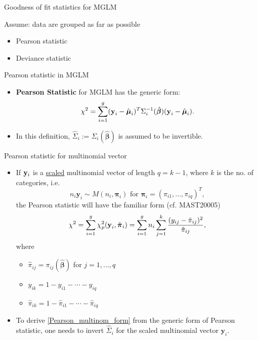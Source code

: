 \documentclass{beamer}
\newcommand{\boldpi}{{\boldsymbol \pi}}
\newenvironment{wideitemize}%
  {\begin{itemize}%
    \setlength{\parskip}{1em}}%
  {\end{itemize}}
\begin{document}
\begin{frame} {Goodness of fit statistics for MGLM}

Assume: data are grouped as far as possible

\begin{itemize}
\item Pearson statistic
\item Deviance statistic
\end{itemize}

\end{frame}

\begin{frame}{Pearson statistic in MGLM}

\begin{itemize}
\item
\textbf{Pearson Statistic} for MGLM has the generic form:
\[
\chi^2 =  \sum_{i=1}^g (\textbf{y}_i-\hat{\mbox{\boldmath $\mu$}}_i)^T
\Sigma_i^{-1}(\hat{\boldsymbol \beta})(\textbf{y}_i-\hat{\mbox{\boldmath $\mu$}}_i).
\]

\item In this definition, $ \hat{\Sigma}_i  := \Sigma_i(\hat{\boldsymbol \beta})$ is assumed to be invertible.


\end{itemize}
\end{frame}
\begin{frame}{Pearson statistic for multinomial vector}
\begin{wideitemize}
\item 
 If
${\bf y}_i$  is a \underline{scaled} multinomial vector of length $q = k-1$, where $k$ is the no.  of categories, i.e.
\[
n_i\textbf{y}_i\sim
M(n_i, \boldpi_i) \text{ for } \boldpi_i = (\pi_{i1}, \dots, \pi_{iq})^T,
\]
 the Pearson statistic will have the familiar form (cf. MAST20005)
\begin{equation} \label{Pearson_multinom_form}
\chi^2=\sum_{i=1}^g \chi_p^2(\textbf{y}_i, \hat{\mbox{\boldmath $\pi$}}_i)=
\sum_{i=1}^g n_i\sum_{j=1}^k\frac{(y_{ij}-\hat{\pi}_{ij})^2}{\hat{\pi}_{ij}},
\end{equation}
where 
\begin{itemize}
\item $\hat{\pi}_{ij} = \pi_{ij}(\hat{{\boldsymbol \beta}})$ for $j = 1, \dots, q$
\item  $y_{ik}=1-y_{i1}-\cdots-y_{iq}$
\item   $\hat{\pi}_{ik}=1-\hat{\pi}_{i1}-\cdots-\hat{\pi}_{iq}$
\end{itemize}



\item To derive \eqref{Pearson_multinom_form} from the generic form of Pearson statistic, one needs to invert
 $
 \hat{\Sigma}_i 
$
for the scaled multinomial vector $\textbf{y}_i$.  

\end{wideitemize}
\end{frame}
\end{document}

